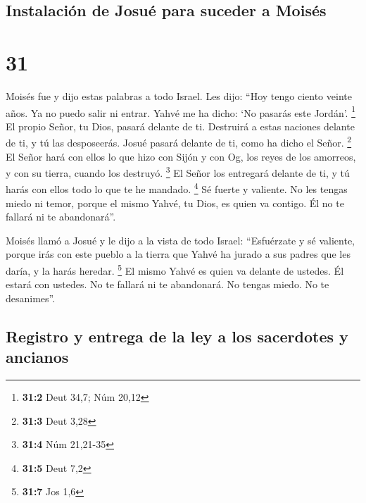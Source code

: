 \hypertarget{instalaciuxf3n-de-josuuxe9-para-suceder-a-moisuxe9s}{%
\subsection{Instalación de Josué para suceder a
Moisés}\label{instalaciuxf3n-de-josuuxe9-para-suceder-a-moisuxe9s}}

\hypertarget{section-30}{%
\section{31}\label{section-30}}

 Moisés fue y dijo estas palabras a todo Israel.
 Les dijo: ``Hoy tengo ciento veinte años. Ya no puedo
salir ni entrar. Yahvé me ha dicho: `No pasarás este Jordán'.
\footnote{\textbf{31:2} Deut 34,7; Núm 20,12}  El propio
Señor, tu Dios, pasará delante de ti. Destruirá a estas naciones delante
de ti, y tú las desposeerás. Josué pasará delante de ti, como ha dicho
el Señor. \footnote{\textbf{31:3} Deut 3,28}  El Señor
hará con ellos lo que hizo con Sijón y con Og, los reyes de los
amorreos, y con su tierra, cuando los destruyó. \footnote{\textbf{31:4}
  Núm 21,21-35}  El Señor los entregará delante de ti, y
tú harás con ellos todo lo que te he mandado. \footnote{\textbf{31:5}
  Deut 7,2}  Sé fuerte y valiente. No les tengas miedo ni
temor, porque el mismo Yahvé, tu Dios, es quien va contigo. Él no te
fallará ni te abandonará''.

 Moisés llamó a Josué y le dijo a la vista de todo Israel:
``Esfuérzate y sé valiente, porque irás con este pueblo a la tierra que
Yahvé ha jurado a sus padres que les daría, y la harás heredar.
\footnote{\textbf{31:7} Jos 1,6}  El mismo Yahvé es quien
va delante de ustedes. Él estará con ustedes. No te fallará ni te
abandonará. No tengas miedo. No te desanimes''.

\hypertarget{registro-y-entrega-de-la-ley-a-los-sacerdotes-y-ancianos}{%
\subsection{Registro y entrega de la ley a los sacerdotes y
ancianos}\label{registro-y-entrega-de-la-ley-a-los-sacerdotes-y-ancianos}}

